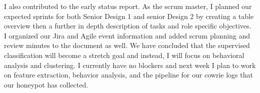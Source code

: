 \documentclass{article}
\begin{document}
\indent I also contributed to the early status report. As the scrum master, I planned our expected sprints for both Senior Design 1 and senior Design 2 by creating a table overview then a further in depth description of tasks and role specific objectives. I organized our Jira and Agile event information and added scrum planning and review minutes to the document as well. We have concluded that the supervised classification will become a stretch goal and instead, I will focus on behavioral analysis and clustering. I currently have no blockers and next week I plan to work on feature extraction, behavior analysis, and the pipeline for our cowrie logs that our honeypot has collected. 
\end{document}

